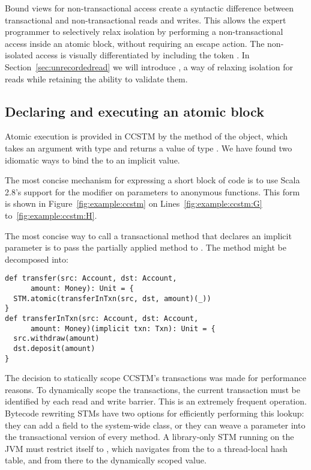 Bound views for non-transactional access create a syntactic difference
between transactional and non-transactional reads and writes.
This allows the expert programmer to selectively relax isolation by
performing a non-transactional access inside an atomic block, without
requiring an escape action.  The non-isolated access
is visually differentiated by including the token .  In
Section~\ref{sec:unrecordedread} we will introduce ,
a way of relaxing isolation for reads while retaining the ability to
validate them.

\subsection{Declaring and executing an atomic block}

Atomic execution is provided in CCSTM by the  method of
the  object, which takes an argument with type
 and returns a value of type .
We have found two idiomatic ways to bind the  to an implicit
value.

\color{green}
The most concise mechanism for expressing a short block of code is to use
Scala 2.8's support for the  modifier on parameters to
anonymous functions.  This form is shown in Figure~\ref{fig:example:ccstm}
on Lines~\ref{fig:example:ccstm:G} to~\ref{fig:example:ccstm:H}.

The most concise way to call a transactional method that declares an implicit
 parameter is to pass the partially applied method to
.  The  method
might be decomposed into:
\lstset{numbers=none}
\lstset{xleftmargin=0.125in}
\begin{lstlisting}
def transfer(src: Account, dst: Account,
      amount: Money): Unit = {
  STM.atomic(transferInTxn(src, dst, amount)(_))
}
def transferInTxn(src: Account, dst: Account,
      amount: Money)(implicit txn: Txn): Unit = {
  src.withdraw(amount)
  dst.deposit(amount)
}
\end{lstlisting}
\lstset{numbers=left}
\lstset{xleftmargin=0.25in}


The decision to statically scope CCSTM's transactions was made for
performance reasons.  To dynamically scope the transactions, the
current transaction must be identified by each read and write barrier.
This is an extremely frequent operation.  Bytecode rewriting STMs have
two options for efficiently performing this lookup: they can add a field
to the system-wide  class, or they can weave a 
parameter into the transactional version of every method.  A library-only
STM running on the JVM must restrict itself to ,
which navigates from the  to a thread-local hash table,
and from there to the dynamically scoped value.
\color{black}
